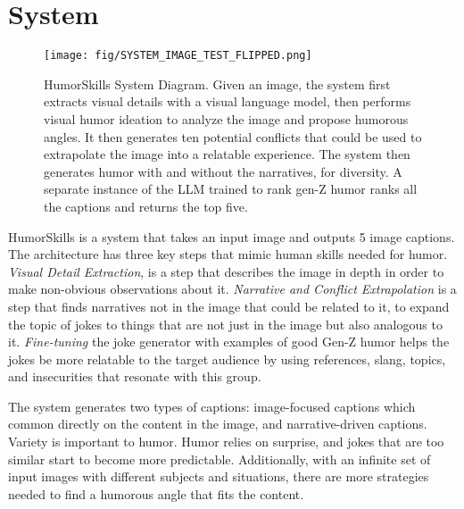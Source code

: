 \section{System}
\begin{figure*}[h]
    \centering
    \texttt{[image: fig/SYSTEM\_IMAGE\_TEST\_FLIPPED.png]}
    \caption{HumorSkills System Diagram. Given an image, the system first extracts visual details with a visual language model, then performs visual humor ideation to analyze the image and propose humorous angles. It then generates ten potential conflicts that could be used to extrapolate the image into a relatable experience. The system then generates humor with and without the narratives, for diversity. A separate instance of the LLM trained to rank gen-Z humor ranks all the captions and returns the top five.}
    \label{fig:system}
\end{figure*}

HumorSkills is a system that takes an input image and outputs 5 image captions. 
The architecture has three key steps that mimic human skills needed for humor. \textit{Visual Detail Extraction}, is a step that describes the image in depth in order to make non-obvious observations about it. \textit{Narrative and Conflict Extrapolation} is a step that finds narratives not in the image that could be related to it, to expand the topic of jokes to things that are not just in the image but also analogous to it.  \textit{Fine-tuning} the joke generator with examples of good Gen-Z humor helps the jokes be more relatable to the target audience by using references, slang, topics, and insecurities that resonate with this group.


The system generates two types of captions: image-focused captions which common directly on the content in the image, and narrative-driven captions. Variety is important to humor. Humor relies on surprise, and jokes that are too similar start to become more predictable. Additionally, with an infinite set of input images with different subjects and situations, there are more strategies needed to find a humorous angle that fits the content. 

